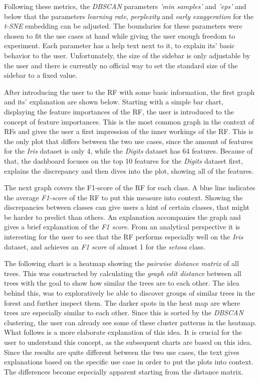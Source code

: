 \documentclass[a4paper, 12pt]{article}
\begin{document}
Following these metrics, the \textit{DBSCAN} parameters \textit{'min samples'} and \textit{'eps'} and
below that the parameters \textit{learning rate}, \textit{perplexity} and \textit{early exaggeration} for
the \textit{t-SNE} embedding can be adjusted. The boundaries for these parameters were chosen to fit the
use cases at hand while giving the user enough freedom to experiment. Each parameter has a help text next
to it, to explain its' basic behavior to the user.
Unfortunately, the size of the sidebar is only adjustable by the user and there is currently no
official way to set the standard size of the sidebar to a fixed value. \par

After introducing the user to the RF with some basic information, the first graph and its' explanation
are shown below. Starting with a simple bar chart, displaying the feature importances of the RF,
the user is introduced to the concept of feature importances. This is the most common graph in the
context of RFs and gives the user a first impression of the inner workings of the RF. This is the only
plot that differs between the two use cases, since the amount of features for the \textit{Iris} dataset
is only 4, while the \textit{Digits} dataset has 64 features. Because of that, the dashboard focuses on the
top 10 features for the \textit{Digits} dataset first, explains the discrepancy and then dives into the
plot, showing all of the features. \par

The next graph covers the F1-score of the RF for each class. A blue line indicates the average
\textit{F1-score} of the RF to put this measure into context. Showing the discrepancies between classes can
give users a hint of certain classes, that might be harder to predict than others. An explanation accompanies
the graph and gives a brief explanation of the \textit{F1 score}.
From an analytical perspective it is interesting for the user to see that the RF performs especially well on
the \textit{Iris} dataset, and achieves an \textit{F1 score} of almost 1 for the \textit{setosa} class. \par

The following chart is a heatmap showing the \textit{pairwise distance matrix} of all trees.
This was constructed by calculating the \textit{graph edit distance} between all trees with the goal to show
how similar the trees are to each other. The idea behind this, was to exploratively be able to discover
groups of similar trees in the forest and further inspect them. The darker spots in the heat map are
where trees are especially similar to each other. Since this is sorted by the \textit{DBSCAN} clustering,
the user can already see some of these cluster patterns in the heatmap. What follows is a more
elaborate explanation of this idea. It is crucial for the user to understand this concept, as the
subsequent charts are based on this idea. Since the results are quite different between the two use
cases, the text gives explanations based on the specific use case in order to put the plots into context.
The differences become especially apparent starting from the distance matrix. \par
\end{document}
